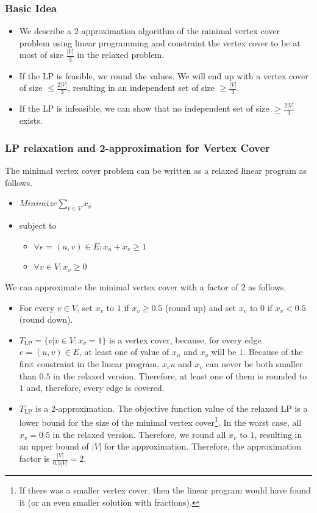 \documentclass[12pt]{article}
\begin{document}
\subsubsection*{Basic Idea}
\begin{itemize}
	\item We describe a 2-approximation algorithm of the minimal vertex cover problem using linear programming and constraint the vertex cover to be at most of size $\frac{|V|}{3}$ in the relaxed problem.
	\item If the LP is feasible, we round the values. We will end up with a vertex cover of size $\leq \frac{2 |V|}{3}$, resulting in an independent set of size $\geq \frac{|V|}{3}$.
	\item If the LP is infeasible, we can show that no independent set of size $\geq \frac{2 |V|}{3}$ exists.
\end{itemize}

\subsubsection*{LP relaxation and 2-approximation for Vertex Cover}
The minimal vertex cover problem can be written as a relaxed linear program as follows.
\begin{itemize}
	\item $\mathit{Minimize } \sum_{v \in V} x_v$
	\item subject to
	\begin{itemize}
		\item $\forall e=(u,v) \in E: x_u + x_v \geq 1$
		\item $\forall v \in V: x_v \geq 0$
	\end{itemize}
\end{itemize}

We can approximate the minimal vertex cover with a factor of $2$ as follows.
\begin{itemize}
	\item For every $v \in V$, set $x_v$ to $1$ if $x_v \geq 0.5$ (round up) and set $x_v$ to $0$ if $x_v < 0.5$ (round down).
	\item $T_{\mbox{LP}} = \{v \left.\right| v \in V: x_v = 1\}$ is a vertex cover, because, for every edge $e = (u,v) \in E$, at least one of value of $x_u$ and $x_v$ will be $1$. Because of the first constraint in the linear program, $x_vu$ and $x_v$ can never be both smaller than $0.5$ in the relaxed version. Therefore, at least one of them is rounded to $1$ and, therefore, every edge is covered.
	\item $T_{\mbox{LP}}$ is a 2-approximation. The objective function value of the relaxed LP is a lower bound for the size of the minimal vertex cover\footnote{If there was a smaller vertex cover, then the linear program would have found it (or an even smaller solution with fractions).}. In the worst case, all $x_v =0.5$ in the relaxed version. Therefore, we round all $x_v$ to $1$, resulting in an upper bound of $|V|$ for the approximation. Therefore, the approximation factor is $\frac{|V|}{0.5 |V|} = 2$.
\end{itemize}
\end{document}
